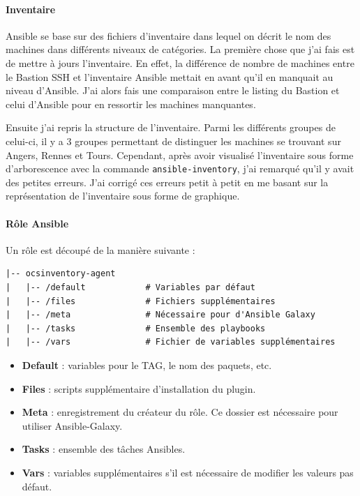 \documentclass[12pt]{article}
\begin{document}
\paragraph{Inventaire}
Ansible se base sur des fichiers d'inventaire dans lequel on décrit le nom des machines dans différents niveaux de catégories. 
La première chose que j'ai fais est de mettre à jours l'inventaire. 
En effet, la différence de nombre de machines entre le Bastion SSH et l'inventaire Ansible mettait en avant qu'il en manquait au niveau d'Ansible. 
J'ai alors fais une comparaison entre le listing du Bastion et celui d'Ansible pour en ressortir les machines manquantes.

Ensuite j'ai repris la structure de l'inventaire. 
Parmi les différents groupes de celui-ci, il y a 3 groupes permettant de distinguer les machines se trouvant sur Angers, Rennes et Tours. 
Cependant, après avoir visualisé l'inventaire sous forme d'arborescence avec la commande \verb|ansible-inventory|, j'ai remarqué qu'il y avait des petites erreurs. 
J'ai corrigé ces erreurs petit à petit en me basant sur la représentation de l'inventaire sous forme de graphique.

\paragraph{Rôle Ansible}
Un rôle est découpé de la manière suivante :
\begin{verbatim}
|-- ocsinventory-agent
|   |-- /default            # Variables par défaut
|   |-- /files              # Fichiers supplémentaires
|   |-- /meta               # Nécessaire pour d'Ansible Galaxy
|   |-- /tasks              # Ensemble des playbooks
|   |-- /vars               # Fichier de variables supplémentaires
\end{verbatim}

\begin{itemize}
    \item \textbf{Default} : variables pour le TAG, le nom des paquets, etc.
    \item \textbf{Files} : scripts supplémentaire d'installation du plugin.
    \item \textbf{Meta} : enregistrement du créateur du rôle. Ce dossier est nécessaire pour utiliser Ansible-Galaxy.
    \item \textbf{Tasks} : ensemble des tâches Ansibles.
    \item \textbf{Vars} : variables supplémentaires s'il est nécessaire de modifier les valeurs pas défaut.
\end{itemize}
\end{document}
